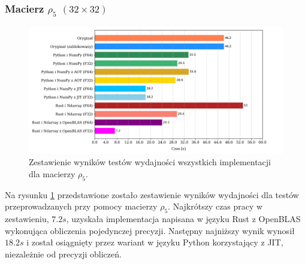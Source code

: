 \documentclass[11pt, a4paper]{article}
\begin{document}
\begin{sloppypar}
    \subsubsection{Macierz \texorpdfstring{$\rho_{5}$ $(32\times32)$}{rho5 32x32}}
    \begin{figure}[!ht]
      \centering
      \includegraphics[width=1.0\textwidth]{"resources/rho_5_matrix_comparison.png"}
      \caption{Zestawienie wyników testów wydajności wszystkich implementacji dla macierzy $\rho
      _{5}$.}
      \label{matrix-comparison-rho-5-plot}
    \end{figure}
    Na rysunku \ref{matrix-comparison-rho-5-plot} przedstawione zostało zestawienie
    wyników wydajności dla testów przeprowadzanych przy pomocy macierzy $\rho_{5}$. Najkrótszy
    czas pracy w zestawieniu, $7.2s$, uzyskała implementacja napisana w języku Rust z OpenBLAS
    wykonująca obliczenia pojedynczej precyzji. Następny najniższy wynik wynosił $18.2s$
    i został osiągnięty przez wariant w języku Python korzystający z JIT, niezależnie od
    precyzji obliczeń.

    \FloatBarrier


\end{sloppypar}
\end{document}
